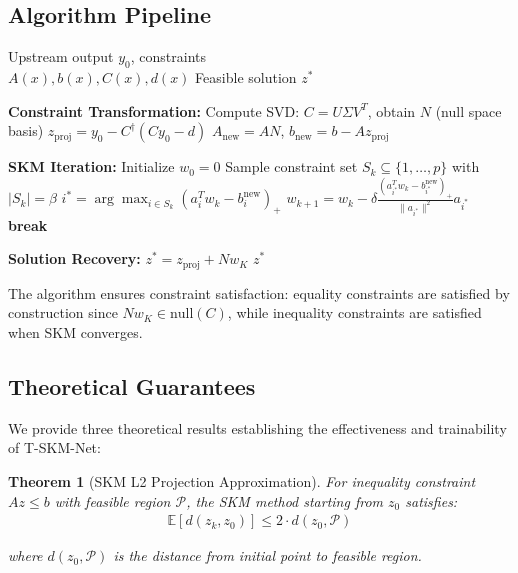 \documentclass[letterpaper]{article} %
\newtheorem{theorem}{Theorem}
\begin{document}

\subsection{Algorithm Pipeline}

\begin{algorithm}[h]
\caption{T-SKM-Net Constraint Satisfaction}
\label{alg:tskm}
\begin{algorithmic}[1]
\REQUIRE Upstream output $y_0$, constraints\\ $A(x), b(x), C(x), d(x)$
\ENSURE Feasible solution $z^*$

\STATE \textbf{Constraint Transformation:}
\STATE Compute SVD: $C = U\Sigma V^T$, obtain $N$ (null space basis)
\STATE $z_{\text{proj}} = y_0 - C^{\dagger}(Cy_0 - d)$
\STATE $A_{\text{new}} = AN$, $b_{\text{new}} = b - Az_{\text{proj}}$

\STATE \textbf{SKM Iteration:}
\STATE Initialize $w_0 = 0$
    \STATE Sample constraint set $S_k \subseteq \{1,\ldots,p\}$ with $|S_k| = \beta$
    \STATE $i^* = \arg\max_{i \in S_k} (a_i^T w_k - b_i^{\text{new}})_+$
    \STATE $w_{k+1} = w_k - \delta \frac{(a_{i^*}^T w_k - b_{i^*}^{\text{new}})_+}{\|a_{i^*}\|^2} a_{i^*}$
        \STATE \textbf{break}
    \ENDIF
\ENDFOR

\STATE \textbf{Solution Recovery:}
\STATE $z^* = z_{\text{proj}} + Nw_K$
\RETURN $z^*$
\end{algorithmic}
\end{algorithm}

The algorithm ensures constraint satisfaction: equality constraints are satisfied by construction since $Nw_K \in \text{null}(C)$, while inequality constraints are satisfied when SKM converges.

\subsection{Theoretical Guarantees}

We provide three theoretical results establishing the effectiveness and trainability of T-SKM-Net:

\begin{theorem}[SKM L2 Projection Approximation]
\label{thm:skm-l2}
For inequality constraint $Az\leq b$ with feasible region $\mathcal{P}$, the SKM method starting from $z_0$ satisfies:
\begin{align}
\mathbb{E}[d(z_{k},z_{0})] \leq 2 \cdot d(z_{0},\mathcal{P})
\end{align}

where $d(z_0, \mathcal{P})$ is the distance from initial point to feasible region.
\end{theorem}
\end{document}
